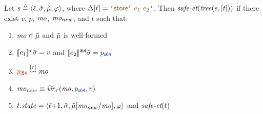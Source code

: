 \begin{interfacelemma}
\label{lemma:interface-store}
Let $s \triangleq \langle{\ell},{\tilde\sigma},{\tilde{\mu}},{\varphi}\rangle$,
where \textup{$\instrat{\location} = \codequote{\tstore^{\tau}~e_1~e_2}$}.
Then $\textit{safe-et}(\mathit{tree}(s, [t]))$ if there exist $v$, $p$, $\mathit{mo}$, $\mathit{mo}_{new}$, and $t$ such that:
\begin{enumerate}
    \item $\mathit{mo} \in \tilde{\mu}$ and $\tilde{\mu}$ is well-formed
    \item \textup{$\llbracket e_1 \rrbracket^{\tau}{\tilde\sigma} = v$} and \textup{$\evalexprty{e_2}{\symlocalstore}{\bvsort{64}} = \bvconst{64}{p}$}
    \item \textup{$\isinbounds{\bvval{p}{64}}{|\tau|}{\mo}$}
    \item \textup{$\mo_{new} \equiv \symmowrite{\tau}{\mo}{\bvconst{64}{p}}{v}$}
    \item $t.\mathit{state} = \langle{{\ell}{+}1},{\tilde\sigma},{\tilde{\mu}[\mathit{mo}_{new}/\mathit{mo}]},{\varphi}\rangle$ and $\textit{safe-et}(t)$
\end{enumerate}
\end{interfacelemma}
